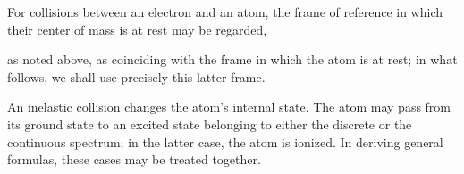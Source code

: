 For collisions between an electron and an atom, the frame of reference in which their center of mass is at rest may be regarded,

as noted above, as coinciding with the frame in which the atom is at rest; in what follows, we shall use precisely this latter frame.

An inelastic collision changes the atom's internal state. The atom may pass from its ground state to an excited state belonging to either the discrete or the continuous spectrum; in the latter case, the atom is ionized. In deriving general formulas, these cases may be treated together.
